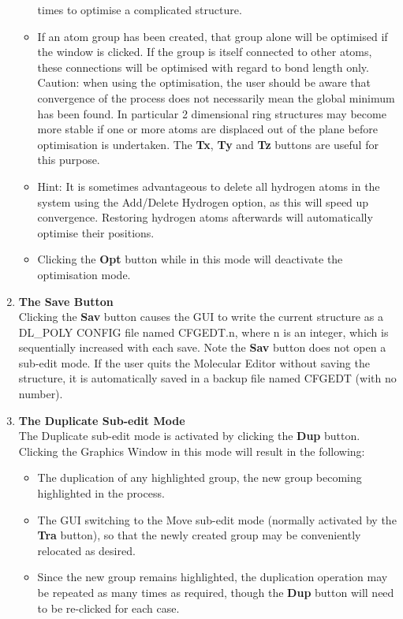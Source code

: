 \begin{enumerate}
\begin{itemize}
  times to optimise a complicated structure.  
\item If an atom group has been created, that group alone will be optimised if
  the window is clicked. If the group is itself connected to other atoms,
  these connections will be optimised with regard to bond length only.
  Caution: when using the optimisation, the user should be aware that
  convergence of the process does not necessarily mean the global minimum has
  been found. In particular 2 dimensional ring structures may become more
  stable if one or more atoms are displaced out of the plane before
  optimisation is undertaken. The {\bf Tx}, {\bf Ty} and {\bf Tz} buttons are
  useful for this purpose.  
\item Hint: It is sometimes advantageous to delete all hydrogen atoms in the
  system using the Add/Delete Hydrogen option, as this will speed up
  convergence. Restoring hydrogen atoms afterwards will automatically optimise
  their positions.  
\item Clicking the {\bf Opt} button while in this mode will deactivate the
  optimisation mode.
\end{itemize}
\item {\bf The Save Button}\\
  Clicking the {\bf Sav} button causes the GUI to write the current structure
  as a DL\_POLY CONFIG file named CFGEDT.n, where n is an integer, which is
  sequentially increased with each save. Note the {\bf Sav} button does not
  open a sub-edit mode. If the user quits the Molecular Editor without saving
  the structure, it is automatically saved in a backup file named CFGEDT (with
  no number).
\item {\bf The Duplicate Sub-edit Mode}\\
  The Duplicate sub-edit mode is activated by clicking the {\bf Dup} button.
  Clicking the Graphics Window in this mode will result in the following:
\begin{itemize}
\item The duplication of any highlighted group, the new group becoming
  highlighted in the process.  
\item The GUI switching to the Move sub-edit mode (normally activated by the
  {\bf Tra} button), so that the newly created group may be conveniently
  relocated as desired.  
\item Since the new group remains highlighted, the duplication operation may
  be repeated as many times as required, though the {\bf Dup} button will
  need to be re-clicked for each case.  

\end{itemize}
\end{enumerate}
